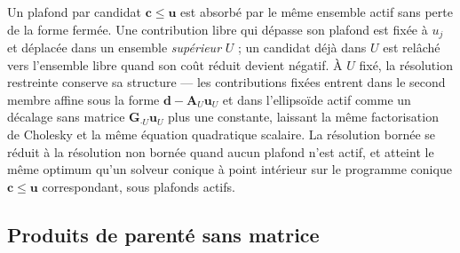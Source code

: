 \documentclass[11pt]{article}
\newcommand{\bc}{\mathbf{c}}
\newcommand{\bG}{\mathbf{G}}
\newcommand{\bA}{\mathbf{A}}
\newcommand{\bd}{\mathbf{d}}
\newcommand{\bu}{\mathbf{u}}
\begin{document}
Un plafond par candidat $\bc\le\bu$ est absorbé par le même ensemble actif sans perte de la forme fermée. Une contribution libre qui dépasse son plafond est fixée à $u_j$ et déplacée dans un ensemble \emph{supérieur} $U$ ; un candidat déjà dans $U$ est relâché vers l'ensemble libre quand son coût réduit devient négatif. À $U$ fixé, la résolution restreinte conserve sa structure --- les contributions fixées entrent dans le second membre affine sous la forme $\bd-\bA_U\bu_U$ et dans l'ellipsoïde actif comme un décalage sans matrice $\bG_{\cdot U}\bu_U$ plus une constante, laissant la même factorisation de Cholesky et la même équation quadratique scalaire. La résolution bornée se réduit à la résolution non bornée quand aucun plafond n'est actif, et atteint le même optimum qu'un solveur conique à point intérieur sur le programme conique $\bc\le\bu$ correspondant, sous plafonds actifs.

\subsection{Produits de parenté sans matrice}
\end{document}
